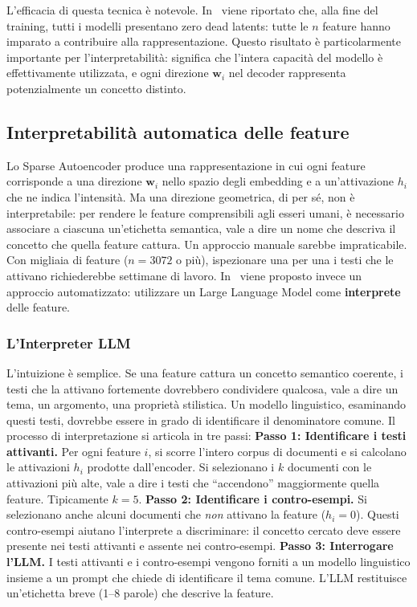 L'efficacia di questa tecnica è notevole. In~\parencite{oneill2024disentangling} viene riportato che, alla fine del training, tutti i modelli presentano zero dead latents: tutte le $n$ feature hanno imparato a contribuire alla rappresentazione. Questo risultato è particolarmente importante per l'interpretabilità: significa che l'intera capacità del modello è effettivamente utilizzata, e ogni direzione $\mathbf{w}_i$ nel decoder rappresenta potenzialmente un concetto distinto.
\subsection{Interpretabilità automatica delle feature}
\label{subsec:interpretability}
Lo Sparse Autoencoder produce una rappresentazione in cui ogni feature corrisponde a una direzione $\mathbf{w}_i$ nello spazio degli embedding e a un'attivazione $h_i$ che ne indica l'intensità. Ma una direzione geometrica, di per sé, non è interpretabile: per rendere le feature comprensibili agli esseri umani, è necessario associare a ciascuna un'etichetta semantica, vale a dire un nome che descriva il concetto che quella feature cattura.
Un approccio manuale sarebbe impraticabile. Con migliaia di feature ($n = 3072$ o più), ispezionare una per una i testi che le attivano richiederebbe settimane di lavoro. In~\parencite{oneill2024disentangling} viene proposto invece un approccio automatizzato: utilizzare un Large Language Model come \textbf{interprete} delle feature.
\subsubsection{L'Interpreter LLM}
\label{subsubsec:interpreter}
L'intuizione è semplice. Se una feature cattura un concetto semantico coerente, i testi che la attivano fortemente dovrebbero condividere qualcosa, vale a dire un tema, un argomento, una proprietà stilistica. Un modello linguistico, esaminando questi testi, dovrebbe essere in grado di identificare il denominatore comune.
Il processo di interpretazione si articola in tre passi:
\textbf{Passo 1: Identificare i testi attivanti.} Per ogni feature $i$, si scorre l'intero corpus di documenti e si calcolano le attivazioni $h_i$ prodotte dall'encoder. Si selezionano i $k$ documenti con le attivazioni più alte, vale a dire i testi che ``accendono'' maggiormente quella feature. Tipicamente $k = 5$.
\textbf{Passo 2: Identificare i contro-esempi.} Si selezionano anche alcuni documenti che \textit{non} attivano la feature ($h_i = 0$). Questi contro-esempi aiutano l'interprete a discriminare: il concetto cercato deve essere presente nei testi attivanti e assente nei contro-esempi.
\textbf{Passo 3: Interrogare l'LLM.} I testi attivanti e i contro-esempi vengono forniti a un modello linguistico insieme a un prompt che chiede di identificare il tema comune. L'LLM restituisce un'etichetta breve (1--8 parole) che descrive la feature.

